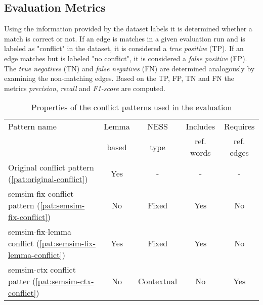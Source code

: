 \documentclass[11pt]{scrreprt}
\begin{document}
\subsection{Evaluation Metrics}
Using the information provided by the dataset labels it is determined whether a match is correct or not. If an edge is matches in a given evaluation run and is labeled as "conflict" in the dataset, it is considered a \textit{true positive} (TP). If an edge matches but is labeled "no conflict", it is considered a \textit{false positive} (FP). The \textit{true negatives} (TN) and \textit{false negatives} (FN) are determined analogously  by examining the non-matching edges. Based on the TP, FP, TN and FN the metrics \textit{precision}, \textit{recall} and \textit{F1-score} are computed. 

\begin{table}
\centering
\begin{tabular}{lcccc}
\toprule
\multicolumn{1}{l}{Pattern name}		& \multicolumn{1}{c}{Lemma}		& \multicolumn{1}{c}{NESS}	& \multicolumn{1}{c}{Includes}		& \multicolumn{1}{c}{Requires} \\
\multicolumn{1}{l}{} 				& \multicolumn{1}{c}{based} 		& \multicolumn{1}{c}{type} 		& \multicolumn{1}{c}{ref. words} 	& \multicolumn{1}{c}{ref. edges} \\
\midrule
Original conflict pattern (\ref{pat:original-conflict})					& Yes 		& - 		& -			& - \\
semsim-fix conflict pattern (\ref{pat:semsim-fix-conflict})				& No		& Fixed		& Yes		& No \\
semsim-fix-lemma conflict (\ref{pat:semsim-fix-lemma-conflict}) 		& Yes 		& Fixed		& Yes		& No \\
semsim-ctx conflict patter (\ref{pat:semsim-ctx-conflict})				& No		& Contextual	& No		& Yes \\
\bottomrule
\end{tabular}
\caption{Properties of the conflict patterns used in the evaluation}
\label{tab:evaluation-patterns}
\end{table}
\end{document}

